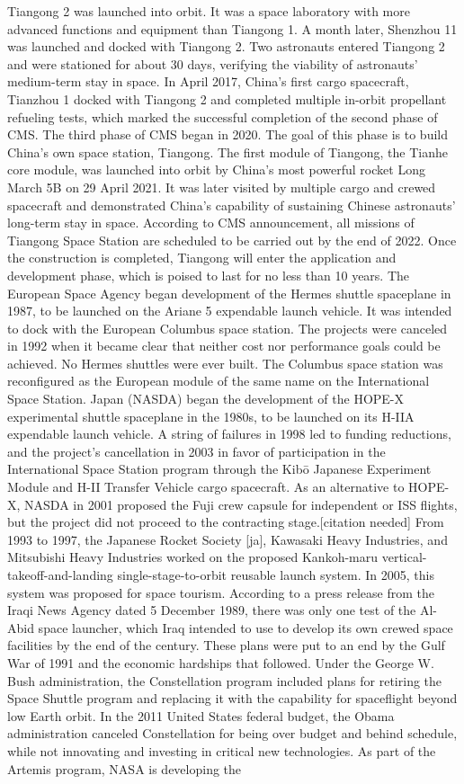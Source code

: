 \documentclass[12pt]{article}
\begin{document}
Tiangong 2 was launched into orbit. It was a space laboratory with more advanced functions and equipment than Tiangong 1. A month later, Shenzhou 11 was launched and docked with Tiangong 2. Two astronauts entered Tiangong 2 and were stationed for about 30 days, verifying the viability of astronauts' medium-term stay in space. In April 2017, China's first cargo spacecraft, Tianzhou 1 docked with Tiangong 2 and completed multiple in-orbit propellant refueling tests, which marked the successful completion of the second phase of CMS. The third phase of CMS began in 2020. The goal of this phase is to build China's own space station, Tiangong. The first module of Tiangong, the Tianhe core module, was launched into orbit by China's most powerful rocket Long March 5B on 29 April 2021. It was later visited by multiple cargo and crewed spacecraft and demonstrated China's capability of sustaining Chinese astronauts' long-term stay in space. According to CMS announcement, all missions of Tiangong Space Station are scheduled to be carried out by the end of 2022. Once the construction is completed, Tiangong will enter the application and development phase, which is poised to last for no less than 10 years. The European Space Agency began development of the Hermes shuttle spaceplane in 1987, to be launched on the Ariane 5 expendable launch vehicle. It was intended to dock with the European Columbus space station. The projects were canceled in 1992 when it became clear that neither cost nor performance goals could be achieved. No Hermes shuttles were ever built. The Columbus space station was reconfigured as the European module of the same name on the International Space Station. Japan (NASDA) began the development of the HOPE-X experimental shuttle spaceplane in the 1980s, to be launched on its H-IIA expendable launch vehicle. A string of failures in 1998 led to funding reductions, and the project's cancellation in 2003 in favor of participation in the International Space Station program through the Kibō Japanese Experiment Module and H-II Transfer Vehicle cargo spacecraft. As an alternative to HOPE-X, NASDA in 2001 proposed the Fuji crew capsule for independent or ISS flights, but the project did not proceed to the contracting stage.[citation needed] From 1993 to 1997, the Japanese Rocket Society [ja], Kawasaki Heavy Industries, and Mitsubishi Heavy Industries worked on the proposed Kankoh-maru vertical-takeoff-and-landing single-stage-to-orbit reusable launch system. In 2005, this system was proposed for space tourism. According to a press release from the Iraqi News Agency dated 5 December 1989, there was only one test of the Al-Abid space launcher, which Iraq intended to use to develop its own crewed space facilities by the end of the century. These plans were put to an end by the Gulf War of 1991 and the economic hardships that followed. Under the George W. Bush administration, the Constellation program included plans for retiring the Space Shuttle program and replacing it with the capability for spaceflight beyond low Earth orbit. In the 2011 United States federal budget, the Obama administration canceled Constellation for being over budget and behind schedule, while not innovating and investing in critical new technologies. As part of the Artemis program, NASA is developing the 
\end{document}
